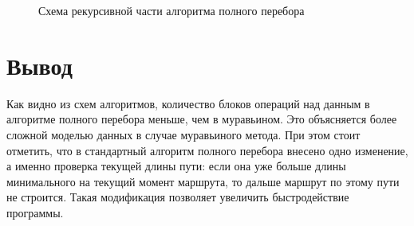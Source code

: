 \documentclass[a4paper,12pt]{report}
\begin{document}
\begin{figure}[ht!]
\caption{Схема рекурсивной части алгоритма полного перебора}
\end{figure}

\newpage

\section{Вывод}

\hspace{0.6cm}Как видно из схем алгоритмов, количество блоков операций над данным в алгоритме полного перебора меньше, чем в муравьином. Это объясняется более сложной моделью данных в случае муравьиного метода. При этом стоит отметить, что в стандартный алгоритм полного перебора внесено одно изменение, а именно проверка текущей длины пути: если она уже больше длины минимального на текущий момент маршрута, то дальше маршрут по этому пути не строится. Такая модификация позволяет увеличить быстродействие программы.
\end{document}
